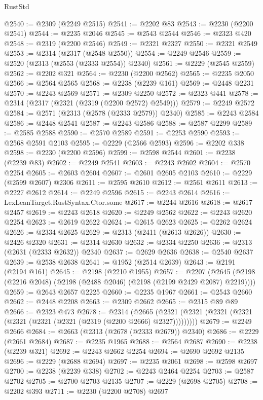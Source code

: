 \begin{lexlean}{RustStd}
\begin{coremodule}
@2540 := @2309 (@2249 @2515)
@2541 := @2202 @83
@2543 := @2230 (@2200 @2541)
@2544 := @2235 @2046
@2545 := @2543 @2544
@2546 := @2323 @420
@2548 := @2319 (@2200 @2546)
@2549 := @2321 @2327
@2550 := @2321 @2549
@2553 := @2314 (@2317 (@2548 @2550))
@2554 := @2249 @2546
@2559 := @2520 (@2313 (@2553 (@2333 @2554)) @2340)
@2561 := @2229 (@2545 @2559)
@2562 := @2202 @321
@2564 := @2230 (@2200 @2562)
@2565 := @2235 @2050
@2566 := @2564 @2565
@2568 := @2238 (@2239 @161)
@2569 := @2448 @2231
@2570 := @2243 @2569
@2571 := @2309 @2250
@2572 := @2323 @441
@2578 := @2314 (@2317 (@2321 (@2319 (@2200 @2572) @2549)))
@2579 := @2249 @2572
@2584 := @2571 (@2313 (@2578 (@2333 @2579)) @2340)
@2585 := @2243 @2584
@2586 := @2448 @2541
@2587 := @2243 @2586
@2588 := @2587 @2299
@2589 := @2585 @2588
@2590 := @2570 @2589
@2591 := @2253 @2590
@2593 := @2568 @2591 @2103
@2595 := @2229 (@2566 @2593)
@2596 := @2202 @338
@2598 := @2230 (@2200 @2596)
@2599 := @2598 @2544
@2601 := @2238 (@2239 @83)
@2602 := @2249 @2541
@2603 := @2243 @2602
@2604 := @2570 @2254
@2605 := @2603 @2604
@2607 := @2601 @2605 @2103
@2610 := @2229 (@2599 @2607) @2306
@2611 := @2595 @2610
@2612 := @2561 @2611
@2613 := @2227 @2612
@2614 := @2249 @2596
@2615 := @2243 @2614
@2616 := LexLeanTarget.RustSyntax.Ctor.some
@2617 := @2244 @2616
@2618 := @2617 @2457
@2619 := @2243 @2618
@2620 := @2249 @2562
@2622 := @2243 @2620 @2254
@2623 := @2619 @2622
@2624 := @2615 @2623
@2625 := @2262 @2624
@2626 := @2334 @2625
@2629 := @2313 (@2411 (@2613 @2626))
@2630 := @2426 @2320
@2631 := @2314 @2630
@2632 := @2334 @2250
@2636 := @2313 (@2631 (@2333 @2632)) @2340
@2637 := @2629 @2636
@2638 := @2540 @2637
@2639 := @2538 @2638
@2641 := @1952 (@2514 @2639)
@2643 := @2191 (@2194 @161)
@2645 := @2198 (@2210 @1955)
@2657 := @2207 (@2645 (@2198 (@2216 @2048) (@2198 (@2488 @2046) (@2198 (@2199 @2429 @2087) @2219))))
@2659 := @2643 @2657 @2225
@2660 := @2235 @1967
@2661 := @2543 @2660
@2662 := @2448 @2208
@2663 := @2309 @2662
@2665 := @2315 @89 @89
@2666 := @2323 @473
@2678 := @2314
    (@2665 (@2321 (@2321 (@2321 (@2321 (@2321 (@2321 (@2321 (@2319 (@2200 @2666) @2327)))))))))
@2679 := @2249 @2666
@2684 := @2663 (@2313 (@2678 (@2333 @2679)) @2340)
@2686 := @2229 (@2661 @2684)
@2687 := @2235 @1965
@2688 := @2564 @2687
@2690 := @2238 (@2239 @321)
@2692 := @2243 @2662 @2254
@2694 := @2690 @2692 @2135
@2696 := @2229 (@2688 @2694)
@2697 := @2235 @2061
@2698 := @2598 @2697
@2700 := @2238 (@2239 @338)
@2702 := @2243 @2464 @2254
@2703 := @2587 @2702
@2705 := @2700 @2703 @2135
@2707 := @2229 (@2698 @2705)
@2708 := @2202 @393
@2711 := @2230 (@2200 @2708) @2697

\end{coremodule}
\end{lexlean}
